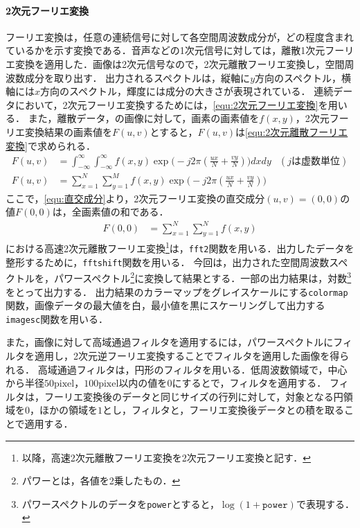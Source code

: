 \paragraph{2次元フーリエ変換}
フーリエ変換は，任意の連続信号に対して各空間周波数成分が，どの程度含まれているかを示す変換である．音声などの1次元信号に対しては，離散1次元フーリエ変換を適用した．画像は2次元信号なので，2次元離散フーリエ変換し，空間周波数成分を取り出す．
出力されるスペクトルは，縦軸に\(y\)方向のスペクトル，横軸には\(x\)方向のスペクトル，輝度には成分の大きさが表現されている．
連続データにおいて，2次元フーリエ変換するためには，\eqref{equ:2次元フーリエ変換}を用いる．
また，離散データ，の画像に対して，画素の画素値を\(f(x,y)\)，2次元フーリエ変換結果の画素値を\(F(u,v)\)とすると，\(F(u,v)\)は\eqref{equ:2次元離散フーリエ変換}で求められる．
\begin{align}
    F(u,v) & =\int_{-\infty}^{\infty}\int_{-\infty}^{\infty}f(x,y)\exp\Big(-j2\pi\left(\frac{ux}{N}+\frac{vy}{N}\right)\Big)dxdy  & (j\textrm{は虚数単位})\label{equ:2次元フーリエ変換} \\
    F(u,v) & =\sum_{x=1}^{N}\sum_{y=1}^{M}f(x,y)\exp\Big(-j2\pi\left(\frac{ux}{N}+\frac{vy}{N}\right)\Big)\label{equ:2次元離散フーリエ変換}
\end{align}
ここで，\eqref{equ:直交成分}より，2次元フーリエ変換の直交成分\((u,v)=(0,0)\)の値\(F(0,0)\)は，全画素値の和である．
\begin{align}
    F(0,0) & = \sum_{x=1}^{N}\sum_{y=1}^{N}f(x,y)\label{equ:直交成分}
\end{align}
\matlab における高速2次元離散フーリエ変換\footnote{以降，高速2次元離散フーリエ変換を2次元フーリエ変換と記す．}は，\texttt{fft2}関数を用いる．出力したデータを整形するために，\texttt{fftshift}関数を用いる．
今回は，出力された空間周波数スペクトルを，パワースペクトル\footnote{パワーとは，各値を2乗したもの．}に変換して結果とする．一部の出力結果は，対数\footnote{パワースペクトルのデータを\texttt{power}とすると，\(\log(1+\texttt{power})\)で表現する．}をとって出力する．
出力結果のカラーマップをグレイスケールにする\texttt{colormap}関数，画像データの最大値を白，最小値を黒にスケーリングして出力する\texttt{imagesc}関数を用いる．\par
また，画像に対して高域通過フィルタを適用するには，パワースペクトルにフィルタを適用し，2次元逆フーリエ変換することでフィルタを適用した画像を得られる．
高域通過フィルタは，円形のフィルタを用いる．低周波数領域で，中心から半径\(50\textrm{pixel}\)，\(100\textrm{pixel}\)以内の値を\(0\)にするとで，フィルタを適用する．
フィルタは，フーリエ変換後のデータと同じサイズの行列に対して，対象となる円領域を\(0\)，ほかの領域を\(1\)とし，フィルタと，フーリエ変換後データとの積を取ることで適用する．
